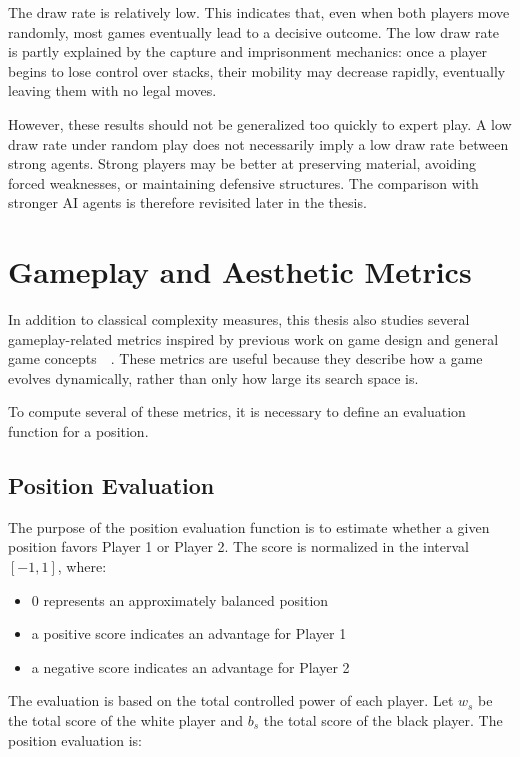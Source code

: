 The draw rate is relatively low. This indicates that, even when both players move randomly, most games eventually lead to a decisive outcome. The low draw rate is partly explained by the capture and imprisonment mechanics: once a player begins to lose control over stacks, their mobility may decrease rapidly, eventually leaving them with no legal moves.

However, these results should not be generalized too quickly to expert play. A low draw rate under random play does not necessarily imply a low draw rate between strong agents. Strong players may be better at preserving material, avoiding forced weaknesses, or maintaining defensive structures. The comparison with stronger AI agents is therefore revisited later in the thesis.

\section{Gameplay and Aesthetic Metrics}

In addition to classical complexity measures, this thesis also studies several gameplay-related metrics inspired by previous work on game design and general game concepts~\cite{browne2010evolutionary}~\cite{browne2008recombination}. These metrics are useful because they describe how a game evolves dynamically, rather than only how large its search space is.

To compute several of these metrics, it is necessary to define an evaluation function for a position.

\subsection{Position Evaluation}

The purpose of the position evaluation function is to estimate whether a given position favors Player 1 or Player 2. The score is normalized in the interval $[-1,1]$, where:

\begin{itemize} 
    \item 0 represents an approximately balanced position
    \item a positive score indicates an advantage for Player 1
    \item a negative score indicates an advantage for Player 2
\end{itemize}

The evaluation is based on the total controlled power of each player. Let $w_s$ be the total score of the white player and $b_s$ the total score of the black player. The position evaluation is:

